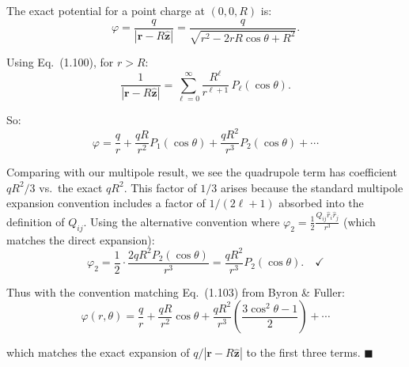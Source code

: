 \documentclass[12pt]{article}
\newcommand{\vect}[1]{\mathbf{#1}}
\begin{document}
The exact potential for a point charge at $(0,0,R)$ is:
\[
\varphi = \frac{q}{|\vect{r} - R\hat{\vect{z}}|} = \frac{q}{\sqrt{r^2 - 2rR\cos\theta + R^2}}.
\]

Using Eq.~(1.100), for $r > R$:
\[
\frac{1}{|\vect{r} - R\hat{\vect{z}}|} = \sum_{\ell=0}^{\infty}\frac{R^\ell}{r^{\ell+1}}\,P_\ell(\cos\theta).
\]

So:
\[
\varphi = \frac{q}{r} + \frac{qR}{r^2}P_1(\cos\theta) + \frac{qR^2}{r^3}P_2(\cos\theta) + \cdots
\]

Comparing with our multipole result, we see the quadrupole term has coefficient $qR^2/3$ vs.\ the exact $qR^2$. This factor of $1/3$ arises because the standard multipole expansion convention includes a factor of $1/(2\ell+1)$ absorbed into the definition of $Q_{ij}$. Using the alternative convention where $\varphi_2 = \frac{1}{2}\frac{Q_{ij}\hat{r}_i\hat{r}_j}{r^3}$ (which matches the direct expansion):
\[
\varphi_2 = \frac{1}{2}\cdot\frac{2qR^2 P_2(\cos\theta)}{r^3} = \frac{qR^2}{r^3}P_2(\cos\theta). \quad \checkmark
\]

Thus with the convention matching Eq.~(1.103) from Byron \& Fuller:
\[
\boxed{\varphi(r,\theta) = \frac{q}{r} + \frac{qR}{r^2}\cos\theta + \frac{qR^2}{r^3}\!\left(\frac{3\cos^2\theta - 1}{2}\right) + \cdots}
\]

which matches the exact expansion of $q/|\vect{r} - R\hat{\vect{z}}|$ to the first three terms. \hfill $\blacksquare$
\end{document}
